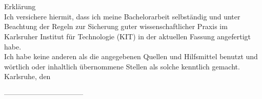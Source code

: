 \chapter*{}
\begin{flushleft}
\vspace{11cm}
Erklärung\\[1cm]
Ich versichere hiermit, dass ich meine Bachelorarbeit selbständig und unter Beachtung der Regeln zur Sicherung guter wissenschaftlicher Praxis im Karlsruher Institut für Technologie (KIT) in der aktuellen Fassung angefertigt habe. \\
Ich habe keine anderen als die angegebenen Quellen und Hilfsmittel benutzt und wörtlich oder inhaltlich übernommene Stellen als solche kenntlich gemacht.\\[1cm]

Karlsruhe, den \abgabe\\[1cm]
\end{flushleft}

\begin{center}
---------------------------------\\
\end{center}
